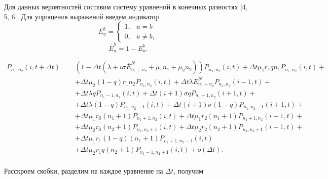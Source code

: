 \hspace*{\parindent}%
Для данных вероятностей составим систему уравнений в конечных разностях [4, 5, 6]. 
Для упрощения выражений введем индикатор
\begin{equation*}
	E_a^b = 
	\begin{cases}
		1, &{a=b}\\
		0, &{a \neq b},
	\end{cases}
\end{equation*}
\begin{equation*}
	\overline{E}_{a}^b = 1 - E_a^b.
\end{equation*}

\begin{equation*}
	\begin{split}	
		P_{n_{1}, n_{2}}(i,t+\Delta t)=&(1-\Delta t(\lambda+i\sigma \overline{E}_{n_{1}+n_{2}}^N+\mu_{1}n_{1}+\mu_{2}n_{2}))P_{n_{1}, n_{2}}(i,t)+\Delta t\mu_{1}r_{1}qn_{1}P_{n_{1}, n_{2}}(i,t)+\\
		&+\Delta t \mu_{2}(1-q)r_{1}n_{2}P_{n_{1}, n_{2}}(i,t)+\Delta t \lambda E_{n_{1}+n_{2}}^N P_{n_{1}, n_{2}}(i-1,t)+\\
		&+\Delta t\lambda qP_{n_{1}-1, n_{2}}(i,t) + \Delta t(i+1) \sigma q P_{n_{1}-1, n_{2}}(i+1,t)+\\
		&+\Delta t\lambda (1-q)P_{n_{1}, n_{2}-1}(i,t) + \Delta t(i+1) \sigma (1-q) P_{n_{1}, n_{2}-1}(i+1,t)+\\
		&+\Delta t \mu_{1} r_{0}(n_{1}+1) P_{n_{1} +1 , n_{2}}(i,t) + \Delta t \mu_{1} r_{2} (n_{1}+1) P_{n_{1} + 1, n_{2}}(i-1,t)+\\
		&+\Delta t \mu_{2} r_{0}(n_{2}+1) P_{n_{1}, n_{2} + 1 }(i,t) + \Delta t\mu_{2} r_{2} (n_{2}+1) P_{n_{1}, n_{2} + 1}(i-1,t)+\\
		&+\Delta t\mu_{1} r_{1}(1-q)(n_{1}+1) P_{n_{1} +1 , n_{2}-1}(i,t)\\
		&+\Delta t\mu_{2} r_{1}q (n_{2}+1)P_{n_{1} -1 , n_{2}+1}(i,t)+o(\Delta t).\\
\end{split}
\end{equation*}

Расскроем скобки, разделим на каждое уравнение на $\Delta t$, получим

